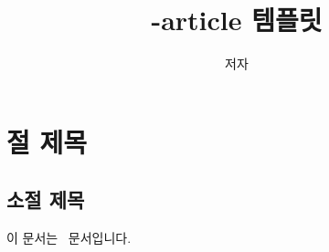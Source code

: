 \documentclass{article}
\begin{document}
\title{\koTeX-article 템플릿}
\author{저자}
\date{}
\maketitle

\section{절 제목}

\subsection{소절 제목}

이 문서는 \koTeX\ 문서입니다.
\end{document}
